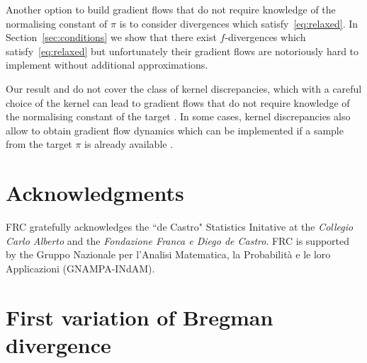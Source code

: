 \documentclass{article}
\begin{document}
Another option to build gradient flows that do not require knowledge of the normalising constant of $\pi$ is to consider divergences which satisfy~\eqref{eq:relaxed}. In Section~\ref{sec:conditions} we show that there exist $f$-divergences which satisfy~\eqref{eq:relaxed} but unfortunately their gradient flows are notoriously hard to implement without additional approximations.

Our result and \citet[Theorem 4.1]{chen2023sampling} do not cover the class of kernel discrepancies, which with a careful choice of the kernel can lead to gradient flows that do not require knowledge of the normalising constant of the target \citep{korba2021kernel}. In some cases, kernel discrepancies also allow to obtain gradient flow dynamics which can be implemented if a sample from the target $\pi$ is already available \cite{arbel2019maximum, belhadji2025weighted}.








\section*{Acknowledgments} 
FRC gratefully acknowledges the ``de Castro" Statistics Initative at the \textit{Collegio Carlo Alberto} and the \textit{Fondazione Franca e Diego de Castro}.
FRC is supported by the Gruppo
Nazionale per l'Analisi Matematica, la Probabilità e le loro Applicazioni (GNAMPA-INdAM).




\appendix
\section{First variation of Bregman divergence}
\label{app:first_variation}
\end{document}
